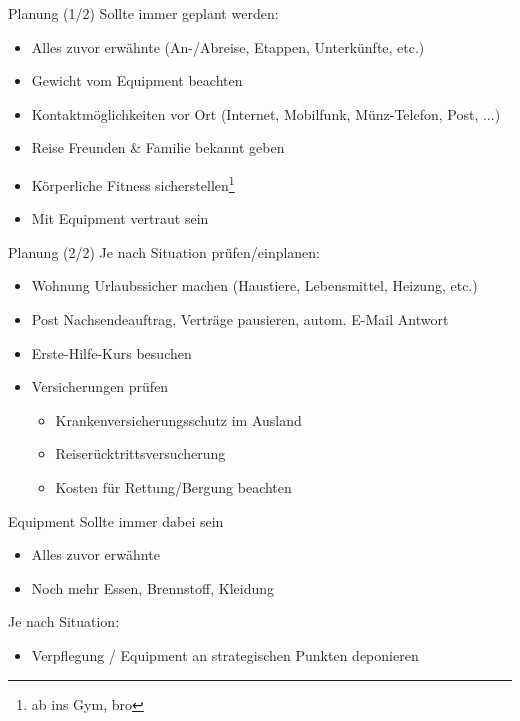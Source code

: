 \documentclass{beamer}
\begin{document}
			\begin{frame}{Planung (1/2)}
				Sollte immer geplant werden:
				\begin{itemize}
					\item Alles zuvor erwähnte (An-/Abreise, Etappen, Unterkünfte, etc.)
					\item Gewicht vom Equipment beachten
					\item Kontaktmöglichkeiten vor Ort (Internet, Mobilfunk, Münz-Telefon, Post, ...)
					\item Reise Freunden \& Familie bekannt geben
					\item Körperliche Fitness sicherstellen\footnote{ab ins Gym, bro}
					\item Mit Equipment vertraut sein
				\end{itemize}
			\end{frame}
				
			\begin{frame}{Planung (2/2)}
				Je nach Situation prüfen/einplanen:
				\begin{itemize}
					\item Wohnung Urlaubssicher machen (Haustiere, Lebensmittel, Heizung, etc.)
					\item Post Nachsendeauftrag, Verträge pausieren, autom. E-Mail Antwort
					\item Erste-Hilfe-Kurs besuchen
					\item Versicherungen prüfen
					\begin{itemize}
						\item Krankenversicherungsschutz im Ausland
						\item Reiserücktrittsversucherung
						\item Kosten für Rettung/Bergung beachten
					\end{itemize}
				\end{itemize}
			\end{frame}
			
			\begin{frame}{Equipment}
				Sollte immer dabei sein
				\begin{itemize}
					\item Alles zuvor erwähnte
					\item Noch mehr Essen, Brennstoff, Kleidung
				\end{itemize}
				Je nach Situation:
				\begin{itemize}
					\item Verpflegung / Equipment an strategischen Punkten deponieren
				\end{itemize}
			\end{frame}
	
\end{document}
